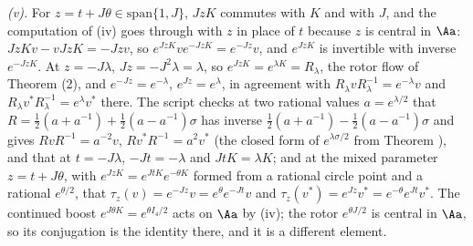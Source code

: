 \emph{(v).} For $z = t + J\theta \in \mathrm{span}\{1, J\}$, $JzK$ commutes with $K$ and with $J$, and the computation of (iv) goes through with $z$ in place of $t$ because $z$ is central in $\Aa$: $JzKv - vJzK = -Jzv$, so $e^{JzK}ve^{-JzK} = e^{-Jz}v$, and $e^{JzK}$ is invertible with inverse $e^{-JzK}$. At $z = -J\lambda$, $Jz = -J^{2}\lambda = \lambda$, so $e^{JzK} = e^{\lambda K} = R_{\lambda}$, the rotor flow of Theorem (2), and $e^{-Jz} = e^{-\lambda}$, $e^{Jz} = e^{\lambda}$, in agreement with $R_{\lambda}vR_{\lambda}^{-1} = e^{-\lambda}v$ and $R_{\lambda}v^{*}R_{\lambda}^{-1} = e^{\lambda}v^{*}$ there. The script checks at two rational values $a = e^{\lambda/2}$ that $R = \tfrac12(a + a^{-1}) + \tfrac12(a - a^{-1})\sigma$ has inverse $\tfrac12(a + a^{-1}) - \tfrac12(a - a^{-1})\sigma$ and gives $RvR^{-1} = a^{-2}v$, $Rv^{*}R^{-1} = a^{2}v^{*}$ (the closed form of $e^{\lambda\sigma/2}$ from Theorem ), and that at $t = -J\lambda$, $-Jt = -\lambda$ and $JtK = \lambda K$; and at the mixed parameter $z = t + J\theta$, with $e^{JzK} = e^{JtK}e^{-\theta K}$ formed from a rational circle point and a rational $e^{\theta/2}$, that $\tau_{z}(v) = e^{-Jz}v = e^{\theta}e^{-Jt}v$ and $\tau_{z}(v^{*}) = e^{Jz}v^{*} = e^{-\theta}e^{Jt}v^{*}$. The continued boost $e^{J\theta K} = e^{\theta I_{4}/2}$ acts on $\Aa$ by (iv); the rotor $e^{\theta J/2}$ is central in $\Aa$, so its conjugation is the identity there, and it is a different element.

